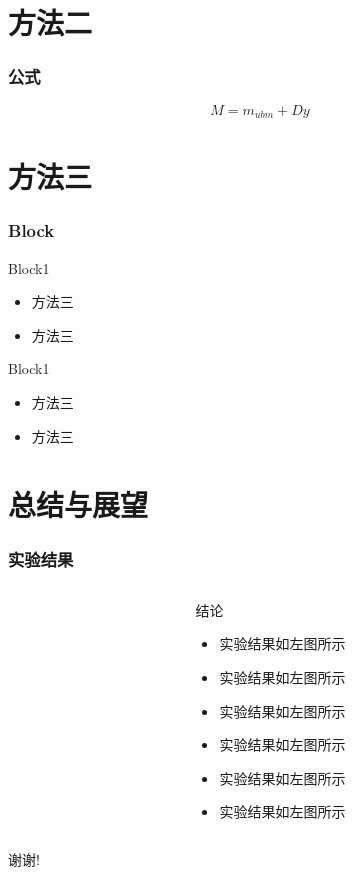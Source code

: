 ﻿\documentclass[12pt]{ctexbeamer}	%
\begin{document}

\section{方法二}

\begin{frame}
\frametitle{公式}
$$M=m_{ubm}+Dy$$
\end{frame}


\section{方法三}

\begin{frame}
\frametitle{Block}
\begin{block}{Block1}
	\begin{itemize}
		\item 方法三
        \item 方法三
	\end{itemize}
\end{block}
\pause
\begin{block}{Block1}
	\begin{itemize}
		\item 方法三
        \item 方法三
	\end{itemize}
\end{block}
\end{frame}


\section{总结与展望}

\begin{frame}
\frametitle{实验结果}
\begin{columns}
\begin{column}{0.50\textwidth}
\end{column}
\begin{column}{0.50\textwidth}
\begin{block}{结论}
\begin{itemize}
\item 实验结果如左图所示
\item 实验结果如左图所示
\item 实验结果如左图所示
\item 实验结果如左图所示
\item 实验结果如左图所示
\item 实验结果如左图所示
\end{itemize}
\end{block}
\end{column}
\end{columns}
\end{frame}




\begin{frame}
\centerline{\Large 谢谢!}
\end{frame}
\end{document}
